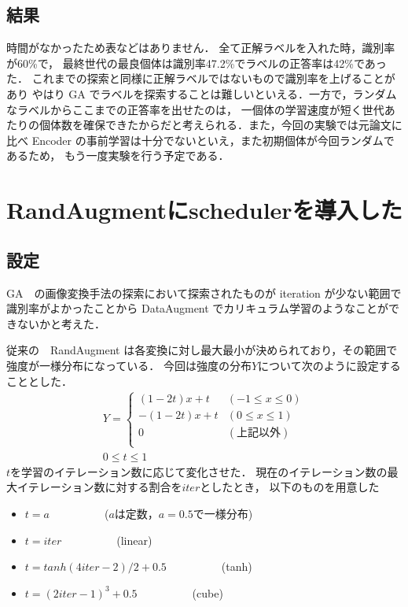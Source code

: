 \documentclass[twocolumn]{jarticle}     %
\begin{document}
\subsection{結果}
時間がなかったため表などはありません．
全て正解ラベルを入れた時，識別率が60\%で，
最終世代の最良個体は識別率47.2\%でラベルの正答率は42\%であった．
これまでの探索と同様に正解ラベルではないもので識別率を上げることがあり
やはり GA でラベルを探索することは難しいといえる．一方で，ランダムなラベルからここまでの正答率を出せたのは，
一個体の学習速度が短く世代あたりの個体数を確保できたからだと考えられる．また，今回の実験では元論文に比べ
 Encoder の事前学習は十分でないといえ，また初期個体が今回ランダムであるため，
もう一度実験を行う予定である．

\section{RandAugmentにschedulerを導入した}
\subsection{設定}
GA　の画像変換手法の探索において探索されたものが iteration が少ない範囲で識別率がよかったことから
DataAugment でカリキュラム学習のようなことができないかと考えた．

従来の　RandAugment は各変換に対し最大最小が決められており，その範囲で強度が一様分布になっている．
今回は強度の分布$Y$について次のように設定することとした．
\begin{eqnarray}
Y=\left\{ \begin{array}{ll}
(1 - 2t)x + t & (-1 \leq x \leq 0) \\
-(1 - 2t)x + t & (0 \leq x \leq 1) \\
0 & (上記以外) \\
\end{array} \right.\\
0 \leq t \leq 1
\end{eqnarray}
$t$を学習のイテレーション数に応じて変化させた．
現在のイテレーション数の最大イテレーション数に対する割合を$iter$としたとき，
以下のものを用意した
\begin{itemize}
	\item $t = a$　　　　　($a$は定数，$a = 0.5$で一様分布)
	\item $t = iter$　　　　　(linear)
	\item $t = tanh(4iter - 2)/2 + 0.5$　　　　　(tanh)
	\item $t = (2iter - 1)^3 + 0.5$　　　　　(cube)
\end{itemize}
\end{document}
